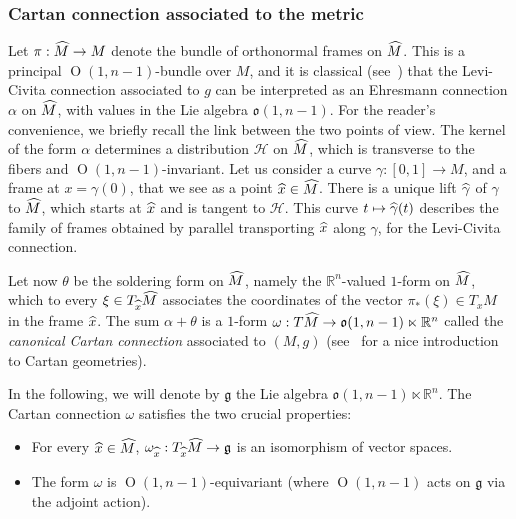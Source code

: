 \documentclass[11pt]{article}
\theoremstyle{definition}
\numberwithin{equation}{section}
\numberwithin{figure}{section}
\numberwithin{table}{section}
\DeclareMathOperator{\Omp}{O}%
\newcommand*\RR{\mathbb{R}}
\newcommand{\lieg}{{\mathfrak{g}}}
\newcommand{\oo}{{\mathfrak{o}}}
\newcommand{\hm}{{\hat{M}}}
\newcommand{\hx}{{\hat{x}}}
\let\oldhat\hat
\renewcommand*\hat[1]{\mathchoice{\widehat{#1}}{\widehat{#1}}{\widehat{#1}}{\oldhat{#1}}}
\begin{document}
\subsubsection{Cartan connection associated to the metric}\label{sec.cartan.connection}
Let $\pi: \hm \to M$ denote the bundle of orthonormal frames on $\hm$. This is a principal $\Omp(1,n-1)$-bundle over $M$, and it is classical (see~\cite[Chapter~IV.2]{kobanomi}) that the Levi-Civita connection associated to $g$ can be interpreted as an Ehresmann connection $\alpha$ on $\hm$, with values in the Lie algebra $\oo(1,n-1)$. For the reader's convenience, we briefly recall the link between the two points of view. The kernel of the form $\alpha$ determines a distribution ${\mathcal H}$ on $\hm$, which is transverse to the fibers and $\Omp(1,n-1)$-invariant. Let us consider a curve $\gamma: [0,1] \to M $, and a frame at $x=\gamma(0)$, that we see as a point $\hat{x} \in \hm$. There is a unique lift $\hat{\gamma}$ of $\gamma$ to $\hm$, which starts at $\hx$ and is tangent to ${\mathcal H}$. This curve $t \mapsto \hat{\gamma}(t)$ describes the family of frames obtained by parallel transporting $\hx$ along $\gamma$, for the Levi-Civita connection.


Let now $\theta$ be the soldering form on $\hm$, namely the $\RR^n$-valued $1$-form on $\hm$, which to every $\xi \in T_{\hx}\hm$ associates the coordinates of the vector $\pi_*(\xi) \in T_xM$ in the frame $\hx$. The sum $\alpha + \theta$ is a $1$-form $\omega: T\hm \to \oo(1,n-1) \ltimes \RR^n$ called the \emph{canonical Cartan connection} associated to $(M,g)$ (see~\cite[Chapter~6]{sharpe} for a nice introduction to Cartan geometries).

In the following, we will denote by $\lieg$ the Lie algebra $\oo(1,n-1) \ltimes \RR^n$. The Cartan connection $\omega$ satisfies the two crucial properties:
\begin{itemize}
\item \label{list3.1.1.1}For every $\hx \in \hm$, $\omega_{\hx}: T_{\hx}\hm \to \lieg$ is an isomorphism of vector spaces.
\item \label{list3.1.1.2}The form $\omega$ is $\Omp(1,n-1)$-equivariant (where $\Omp(1,n-1)$ acts on $\lieg$ via the adjoint action).
\end{itemize}
\end{document}
